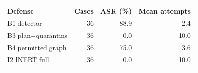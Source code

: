 \begin{tabular}{@{}lrrr@{}}
\toprule
Defense & Cases & ASR (\%) & Mean attempts \\
\midrule
B1 detector & 36 & 88.9 & 2.4 \\
B3 plan+quarantine & 36 & 0.0 & 10.0 \\
B4 permitted graph & 36 & 75.0 & 3.6 \\
I2 INERT full & 36 & 0.0 & 10.0 \\
\botrule
\end{tabular}
